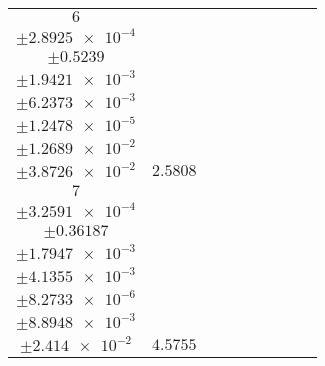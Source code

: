 \documentclass[8pt]{article}
\begin{document}
\begin{longtable}[l]{c c c c c c c c c}
$\num{6}$ & \begin{tabular}[c]{@{}c@{}}$\num{3.0627e-2}$ \\ $\pm\num{2.8925e-4}$\end{tabular} & \begin{tabular}[c]{@{}c@{}}$\num{1.2816}$ \\ $\pm\num{0.5239}$\end{tabular} & \begin{tabular}[c]{@{}c@{}}$\num{7.908}$ \\ $\pm\num{1.9421e-3}$\end{tabular} & \begin{tabular}[c]{@{}c@{}}$\num{3.5554e+3}$ \\ $\pm\num{6.2373e-3}$\end{tabular} & \begin{tabular}[c]{@{}c@{}}$\num{7.1127}$ \\ $\pm\num{1.2478e-5}$\end{tabular} & \begin{tabular}[c]{@{}c@{}}$\num{1.2207}$ \\ $\pm\num{1.2689e-2}$\end{tabular} & \begin{tabular}[c]{@{}c@{}}$\num{4.2752}$ \\ $\pm\num{3.8726e-2}$\end{tabular} & $\num{2.5808}$\\
$\num{7}$ & \begin{tabular}[c]{@{}c@{}}$\num{5.9303e-2}$ \\ $\pm\num{3.2591e-4}$\end{tabular} & \begin{tabular}[c]{@{}c@{}}$\num{-0.25268}$ \\ $\pm\num{0.36187}$\end{tabular} & \begin{tabular}[c]{@{}c@{}}$\num{-4.3331}$ \\ $\pm\num{1.7947e-3}$\end{tabular} & \begin{tabular}[c]{@{}c@{}}$\num{3.5786e+3}$ \\ $\pm\num{4.1355e-3}$\end{tabular} & \begin{tabular}[c]{@{}c@{}}$\num{7.1592}$ \\ $\pm\num{8.2733e-6}$\end{tabular} & \begin{tabular}[c]{@{}c@{}}$\num{1.6282}$ \\ $\pm\num{8.8948e-3}$\end{tabular} & \begin{tabular}[c]{@{}c@{}}$\num{4.4596}$ \\ $\pm\num{2.414e-2}$\end{tabular} & $\num{4.5755}$\\

\end{longtable}
\end{document}

